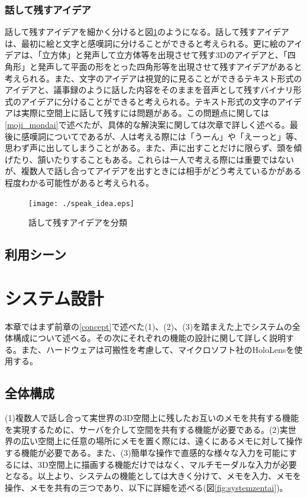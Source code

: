 \documentclass[11pt,a4j, titlepage]{jarticle} %
\begin{document}
\subsubsection{話して残すアイデア} \label{speak_idea}
話して残すアイデアを細かく分けると図\ref{fig:speak_idea}のようになる。話して残すアイデアは、最初に絵と文字と感嘆詞に分けることができると考えられる。更に絵のアイデアは、「立方体」と発声して立方体等を出現させて残す3Dのアイデアと、「四角形」と発声して平面の形をとった四角形等を出現させて残すアイデアがあると考えられる。また、文字のアイデアは視覚的に見ることができるテキスト形式のアイデアと、議事録のように話した内容をそのままを音声として残すバイナリ形式のアイデアに分けることができると考えられる。テキスト形式の文字のアイデアは実際に空間上に話して残すには問題がある。この問題点に関しては\ref{moji_mondai}で述べたが、具体的な解決案に関しては次章で詳しく述べる。最後に感嘆詞についてであるが、人は考える際には「うーん」や「えーっと」等、思わず声に出してしまうことがある。また、声に出すことだけに限らず、頭を傾げたり、頷いたりすることもある。これらは一人で考える際には重要ではないが、複数人で話し合ってアイデアを出すときには相手がどう考えているかがある程度わかる可能性があると考えられる。

\begin{figure}[H]
  \begin{center}
    \texttt{[image: ./speak\_idea.eps]}
    \caption{話して残すアイデアを分類}
    \label{fig:speak_idea}
  \end{center}
\end{figure}

\subsection{利用シーン}

\newpage
\section{システム設計}
本章ではまず前章の\ref{concept}で述べた(1)、(2)、(3)を踏まえた上でシステムの全体構成について述べる。その次にそれぞれの機能の設計に関して詳しく説明する。また、ハードウェアは可搬性を考慮して、マイクロソフト社のHoloLens\cite{hololens}を使用する。

\subsection{全体構成}
(1)複数人で話し合って実世界の3D空間上に残したお互いのメモを共有する機能を実現するために、サーバを介して空間を共有する機能が必要である。(2)実世界の広い空間上に任意の場所にメモを置く際には、遠くにあるメモに対して操作する機能が必要である。また、(3)簡単な操作で直感的な様々な入力を可能にするには、3D空間上に描画する機能だけではなく、マルチモーダルな入力が必要となる。以上より、システムの機能としては大きく分けて、メモを入力、メモを操作、メモを共有の三つであり、以下に詳細を述べる(図\ref{fig:systemzentai})。
\end{document}
